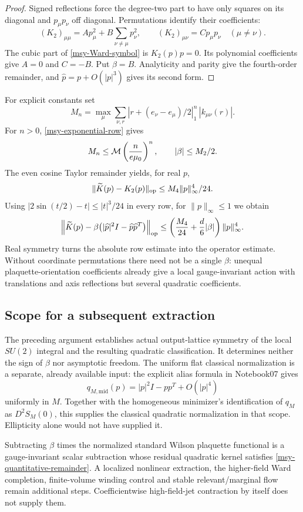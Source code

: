 \begin{proof}
Signed reflections force the degree-two part to have only
squares on its diagonal and \(p_\mu p_\nu\) off diagonal.
Permutations identify their coefficients:
\[
 (K_2)_{\mu\mu}=A p_\mu^2+
                  B\sum_{\nu\ne\mu}p_\nu^2,\qquad
 (K_2)_{\mu\nu}=C p_\mu p_\nu\quad(\mu\ne\nu).
\]
The cubic part of \eqref{msy-Ward-symbol} is \(K_2(p)p=0\).
Its polynomial coefficients give \(A=0\) and \(C=-B\).
Put \(\beta=B\). Analyticity and parity give the fourth-order
remainder, and \(\widehat p=p+O(|p|^3)\) gives its second form.
\end{proof}

For explicit constants set
\begin{equation}
 M_n=\max_\mu\sum_{\nu,r}
 |r+(e_\nu-e_\mu)/2|_1^n\,|k_{\mu\nu}(r)|.
 \label{msy-moments}
\end{equation}
For \(n>0\), \eqref{msy-exponential-row} gives
\[
 M_n\le{\cal M}\left(\frac{n}{e\mu_0}\right)^n,
 \qquad |\beta|\le M_2/2.
\]
The even cosine Taylor remainder yields, for real \(p\),
\[
 \|\widetilde K(p)-K_2(p)\|_{\rm op}
               \le M_4\|p\|_\infty^4/24.
\]
Using \(|2\sin(t/2)-t|\le|t|^3/24\) in every row,
for \(\|p\|_\infty\le1\) we obtain
\begin{equation}
 \left\|\widetilde K(p)
       -\beta\bigl(|\widehat p|^2I-
                        \widehat p\widehat p^T\bigr)\right\|_{\rm op}
 \le\left(\frac{M_4}{24}+\frac d6|\beta|\right)
                              \|p\|_\infty^4 .
 \label{msy-quantitative-remainder}
\end{equation}
Real symmetry turns the absolute row estimate into the
operator estimate. Without coordinate permutations there
need not be a single \(\beta\): unequal plaquette-orientation
coefficients already give a local gauge-invariant action
with translations and axis reflections but several
quadratic coefficients.

\subsection{Scope for a subsequent extraction}
\label{msy-scope-section}

The preceding argument establishes actual output-lattice
symmetry of the local \(SU(2)\) integral and the resulting
quadratic classification. It determines neither the sign
of \(\beta\) nor asymptotic freedom. The uniform flat
classical normalization is a separate, already available
input: the explicit alias formula in Notebook07 gives
\[
 q_{M,\mathrm{mid}}(p)=|p|^2I-pp^T+O(|p|^4)
\]
uniformly in \(M\). Together with the homogeneous minimizer's
identification of \(q_M\) as \(D^2S_M(0)\), this supplies
the classical quadratic normalization in that scope.
Ellipticity alone would not have supplied it.

Subtracting \(\beta\) times the normalized standard Wilson
plaquette functional is a gauge-invariant scalar subtraction
whose residual quadratic kernel satisfies
\eqref{msy-quantitative-remainder}. A localized nonlinear
extraction, the higher-field Ward completion, finite-volume
winding control and stable relevant/marginal flow remain
additional steps. Coefficientwise high-field-jet
contraction by itself does not supply them.
